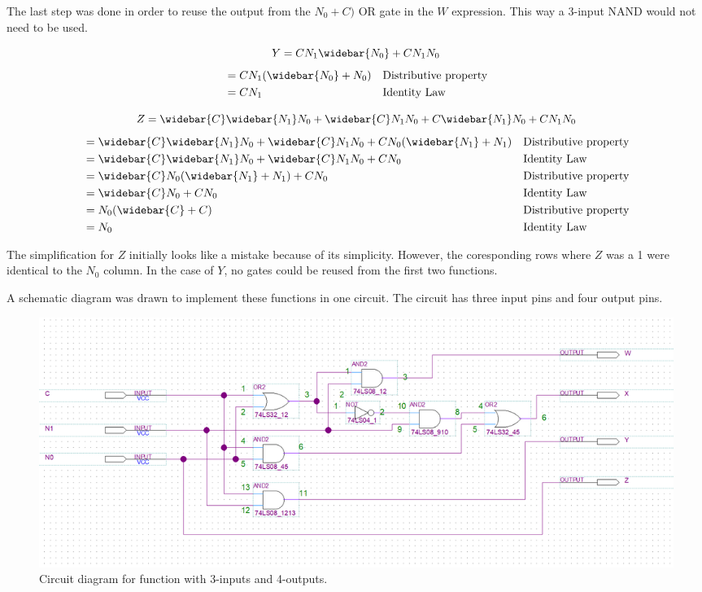 \documentclass[CMPE]{KGCOEReport}
\begin{document}
The last step was done in order to reuse the output from the \(N_0 + C)\) OR gate in the \(W\) expression. This way a 3-input NAND would not need to be used.

\begin{equation*}
Y = CN_1\widebar{N_0} + CN_1N_0
\end{equation*}
\begin{align*}
    &= CN_1(\widebar{N_0} + N_0) && \text{Distributive property}\\
    &= CN_1 && \text{Identity Law}\\
\end{align*}

\begin{equation*}
Z = \widebar{C}\widebar{N_1}N_0 + \widebar{C}N_1N_0 + C\widebar{N_1}N_0 + CN_1N_0
\end{equation*}
\begin{align*}
    &= \widebar{C}\widebar{N_1}N_0 + \widebar{C}N_1N_0 + CN_0(\widebar{N_1} + N_1) && \text{Distributive property}\\
    &= \widebar{C}\widebar{N_1}N_0 + \widebar{C}N_1N_0 + CN_0 && \text{Identity Law}\\
    &= \widebar{C}N_0(\widebar{N_1} + N_1) + CN_0 && \text{Distributive property}\\
    &= \widebar{C}N_0 + CN_0 && \text{Identity Law}\\
    &= N_0(\widebar{C} + C) && \text{Distributive property}\\
    &= N_0 && \text{Identity Law}\\
\end{align*}

The simplification for \(Z\) initially looks like a mistake because of its simplicity. However, the coresponding rows where \(Z\) was a 1 were identical to the \(N_0\) column. In the case of \(Y\), no gates could be reused from the first two functions. \par

\pagebreak

A schematic diagram was drawn to implement these functions in one circuit. The circuit has three input pins and four output pins.

\begin{figure}[htbp]
	\centering
	\includegraphics[width=\textwidth]{circuit}
	\caption{Circuit diagram for function with 3-inputs and 4-outputs.}
	\label{fig:cir}
\end{figure}
\end{document}
